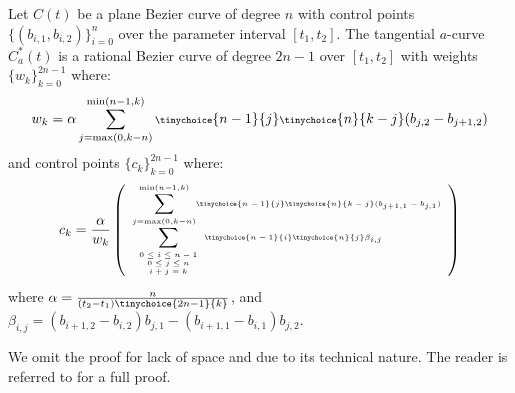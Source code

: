\documentclass[11pt]{article}
\newcommand{\atang}{tangential $a$-curve\ }
\begin{document}
\begin{theorem}
\label{thm:rationalduala}
Let $C(t)$ be a plane Bezier curve of degree $n$ 
with control points $\{ (b_{i,1}, b_{i,2}) \}_{i=0}^n$ over the parameter interval $[t_1,t_2]$.
The \atang $C_a^*(t)$ is a rational Bezier curve of degree $2n-1$ 
over $[t_1,t_2]$ with weights $\{w_k\}_{k=0}^{2n-1}$ where: 
\begin{displaymath}
\scriptsize{
w_k = \alpha
\sum_{j=\mbox{max}(0,k-n)}^{\mbox{min}(n-1,k)} 
\tinychoice{n-1}{j} \tinychoice{n}{k-j} (b_{j,2} - b_{j+1,2})
}
\end{displaymath}
%
and control points $\{c_k\}_{k=0}^{2n-1}$ where:
\begin{displaymath}
\tiny{
c_k = \frac{\alpha}{w_k} 
\left(
\begin{array}{l}
	\displaystyle{\sum_{j=\mbox{\tiny{max}}(0,k-n)}^{\mbox{\tiny{min}}(n-1,k)}}
	\tinychoice{n-1}{j} \tinychoice{n}{k-j} (b_{j+1,1} - b_{j,1})\\
	\displaystyle{\sum_{\begin{array}{c} \mbox{\tiny{$0 \leq i \leq n-1$}} \\ 
			     \mbox{\tiny{$0 \leq j \leq n$}} \\ 
			     \mbox{\tiny{$i+j=k$}}
			     \end{array}}}
\tinychoice{n-1}{i} \tinychoice{n}{j} \beta_{i,j}
\end{array}
\right)
}
\end{displaymath}
where $\alpha = \tiny{\frac{n}{(t_2 - t_1) \tinychoice{2n-1}{k}}}$,
and $\beta_{i,j} = (b_{i+1,2} - b_{i,2}) b_{j,1} - (b_{i+1,1} - b_{i,1}) b_{j,2}$.
\end{theorem}
\prf
We omit the proof for lack of space and due to its technical nature.
The reader is referred to \cite{jj00} for a full proof.
\QED
\end{document}
